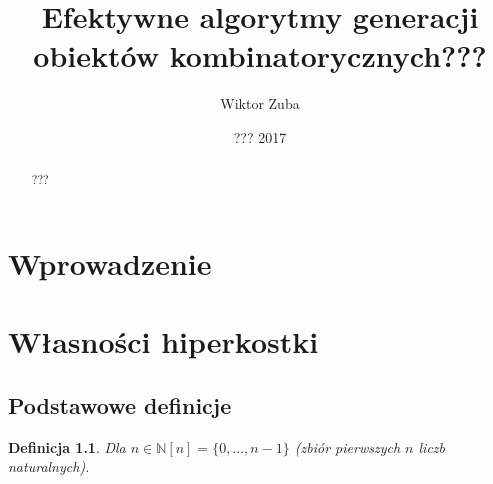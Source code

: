 \documentclass{pracamgr}
\author{Wiktor Zuba}
\title{Efektywne algorytmy generacji obiektów kombinatorycznych???}
\date{??? 2017}
\newtheorem{defi}{Definicja}[section] %
\begin{document}
\maketitle

\begin{abstract}
???
\end{abstract}


\tableofcontents%





 \chapter*{Wprowadzenie}
  
 \chapter{Własności hiperkostki}
  \section{Podstawowe definicje}
   \begin{defi}\label{[n]}
    Dla $n\in\mathbb{N}$\quad $[n]=\{0,...,n-1\}$ (zbiór pierwszych $n$ liczb naturalnych).
   \end{defi}
\end{document}

